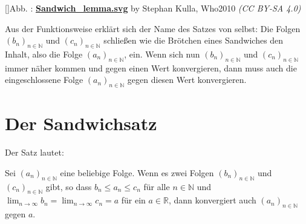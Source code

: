 \documentclass[fontsize=9pt,
               parskip=half-,
               DIV=14,
               listof=chapterentry,
               tocflat]{scrbook}
\newcounter{imagelabel}
\begin{document}
[]{Abb. : \protect\href{https://commons.wikimedia.org/wiki/File:Sandwich_lemma.svg}{\textbf{Sandwich\allowbreak\_lemma.svg}} by Stephan Kulla, Who2010 \textit{(CC BY-SA 4.0)}}\begin{center}
\end{center}

Aus der Funktionsweise erklärt sich der Name des Satzes von selbst: Die Folgen $(b_{n})_{n\in \mathbb {N} }$ und $(c_{n})_{n\in \mathbb {N} }$ schließen wie die Brötchen eines Sandwiches den Inhalt, also die Folge $(a_{n})_{n\in \mathbb {N} }$, ein. Wenn sich nun $(b_{n})_{n\in \mathbb {N} }$ und $(c_{n})_{n\in \mathbb {N} }$ immer näher kommen und gegen einen Wert konvergieren, dann muss auch die eingeschlossene Folge $(a_{n})_{n\in \mathbb {N} }$ gegen diesen Wert konvergieren.

\section{Der Sandwichsatz}

Der Satz lautet:

\begin{theorem*}[Sandwichsatz]
Sei $(a_{n})_{n\in \mathbb {N} }$ eine beliebige Folge. Wenn es zwei Folgen $(b_{n})_{n\in \mathbb {N} }$ und $(c_{n})_{n\in \mathbb {N} }$ gibt, so dass $b_{n}\leq a_{n}\leq c_{n}$ für alle $n\in \mathbb {N} $ und $\lim _{n\rightarrow \infty }b_{n}=\lim _{n\rightarrow \infty }c_{n}=a$ für ein $a\in \mathbb {R} $, dann konvergiert auch $(a_{n})_{n\in \mathbb {N} }$ gegen $a$.

\end{theorem*}
\end{document}

